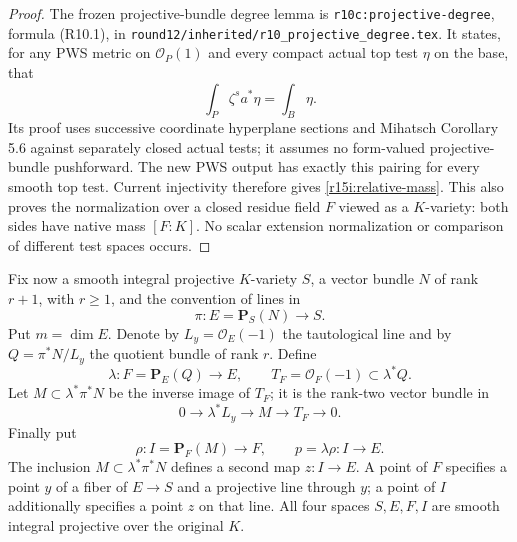 \begin{proof}
The frozen projective-bundle degree lemma is
\texttt{r10c:projective-degree}, formula (R10.1), in
\texttt{round12/inherited/r10\_projective\_degree.tex}.
It states, for any PWS metric on $\mathcal O_P(1)$ and every
compact actual top test $\eta$ on the base, that
\[
                 \int_P\zeta^s a^*\eta=\int_B\eta.
\]
Its proof uses successive coordinate hyperplane sections and
Mihatsch Corollary 5.6 against separately closed actual tests;
it assumes no form-valued projective-bundle pushforward.
The new PWS output has exactly this pairing for every smooth
top test.  Current injectivity therefore gives
\eqref{r15i:relative-mass}.  This also proves the normalization
over a closed residue field $F$ viewed as a $K$-variety: both
sides have native mass $[F:K]$.  No scalar extension
normalization or comparison of different test spaces occurs.
\end{proof}

Fix now a smooth integral projective $K$-variety $S$, a vector
bundle $N$ of rank $r+1$, with $r\geq1$, and the convention of
lines in
\[
                     \pi:E=\mathbf P_S(N)\longrightarrow S.
\]
Put $m=\dim E$.  Denote by $L_y=\mathcal O_E(-1)$ the
tautological line and by $Q=\pi^*N/L_y$ the quotient bundle of
rank $r$.  Define
\[
 \lambda:F=\mathbf P_E(Q)\longrightarrow E,
 \qquad T_F=\mathcal O_F(-1)\subset\lambda^*Q.
\tag{I15.2}\label{r15i:flag-base}
\]
Let $M\subset\lambda^*\pi^*N$ be the inverse image of $T_F$;
it is the rank-two vector bundle in
\[
                0\longrightarrow\lambda^*L_y
                  \longrightarrow M\longrightarrow T_F
                  \longrightarrow0.
\tag{I15.3}\label{r15i:rank-two-subspace}
\]
Finally put
\[
 \rho:I=\mathbf P_F(M)\longrightarrow F,
 \qquad p=\lambda\rho:I\longrightarrow E.
\tag{I15.4}\label{r15i:incidence-tower}
\]
The inclusion $M\subset\lambda^*\pi^*N$ defines a second
map $z:I\to E$.  A point of $F$ specifies a point $y$ of a
fiber of $E\to S$ and a projective line through $y$; a point
of $I$ additionally specifies a point $z$ on that line.
All four spaces $S,E,F,I$ are smooth integral projective over
the original $K$.

